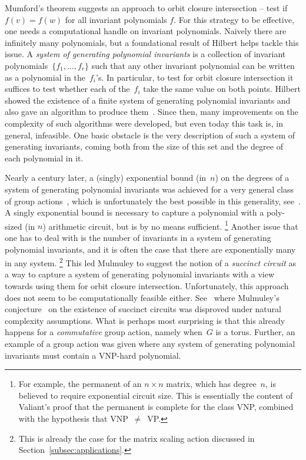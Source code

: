 \documentclass[10pt,a4paper]{article}
\theoremstyle{definition}
\numberwithin{equation}{section}
\begin{document}
Mumford's theorem suggests an approach to orbit closure intersection -- test if $f(v) = f(w)$ for all invariant polynomials $f$.
For this strategy to be effective, one needs a computational handle on invariant polynomials.
Naively there are infinitely many polynomials, but a foundational result of Hilbert helps tackle this issue.
A \emph{system of generating polynomial invariants} is a collection of invariant polynomials~$\{f_1,\dots,f_r\}$ such that any other invariant polynomial can be written as a polynomial in the~$f_i$'s.
In particular, to test for orbit closure intersection it suffices to test whether each of the~$f_i$ take the same value on both points.
Hilbert showed the existence of a finite system of generating polynomial invariants and also gave an algorithm to produce them~\cite{Hilb1}.
Since then, many improvements on the complexity of such algorithms were developed, but even today this task is, in general, infeasible.
One basic obstacle is the very description of such a system of generating invariants, coming both from the size of this set and the degree of each polynomial in it.

Nearly a century later, a (singly) exponential bound (in~$n$) on the degrees of a system of generating polynomial invariants was achieved for a very general class of group actions~\cite{Der01}, which is unfortunately the best possible in this generality, see~\cite{DM-exp}.
A singly exponential bound is necessary to capture a polynomial with a poly-sized (in $n$) arithmetic circuit, but is by no means sufficient.
\footnote{For example, the permanent of an $n\times n$ matrix, which has degree~$n$, is believed to require exponential circuit size.
This is essentially the content of Valiant's proof that the permanent is complete for the class VNP, combined with the hypothesis that VNP~$\ne$~VP.}
Another issue that one has to deal with is the number of invariants in a system of generating polynomial invariants, and it is often the case that there are exponentially many in any system.
\footnote{This is already the case for the matrix scaling action discussed in Section~\ref{subsec:applications}.}
This led Mulmuley \cite{GCTV} to suggest the notion of a \emph{succinct circuit} as a way to capture a system of generating polynomial invariants with a view towards using them for orbit closure intersection.
Unfortunately, this approach does not seem to be computationally feasible either.
See~\cite{GIMOWW} where Mulmuley's conjecture~\cite[Conjecture~5.3]{GCTV} on the existence of succinct circuits was disproved under natural complexity assumptions.
What is perhaps most surprising is that this already happens for a \emph{commutative} group action, namely when~$G$ is a torus.
Further, an example of a group action was given where any system of generating polynomial invariants must contain a VNP-hard polynomial.
\end{document}
